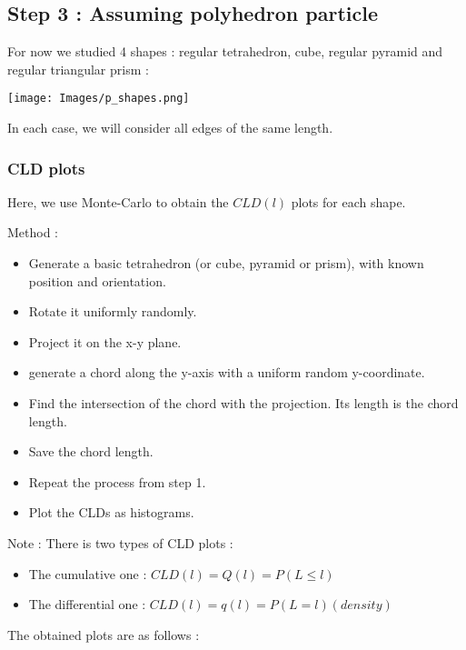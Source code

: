 \subsection{Step 3 : Assuming polyhedron particle}

For now we studied 4 shapes : regular tetrahedron, cube, regular pyramid and regular triangular prism :

\texttt{[image: Images/p\_shapes.png]}

In each case, we will consider all edges of the same length.

\subsubsection{CLD plots}

Here, we use Monte-Carlo to obtain the $CLD(l)$ plots for each shape.

Method : 
\begin{itemize}
    \item Generate a basic tetrahedron (or cube, pyramid or prism), with known position and orientation.
    \item Rotate it uniformly randomly.
    \item Project it on the x-y plane.
    \item generate a chord along the y-axis with a uniform random y-coordinate.
    \item Find the intersection of the chord with the projection. Its length is the chord length.
    \item Save the chord length.
    \item Repeat the process from step 1.
    \item Plot the CLDs as histograms.
\end{itemize}

\vspace{0.5cm} 

Note : There is two types of CLD plots : 
\begin{itemize}
    \item The cumulative one : $CLD(l) = Q(l) = P(L \leq l)$
    \item The differential one : $CLD(l) = q(l) = P(L = l) (density)$
\end{itemize}

The obtained plots are as follows :
